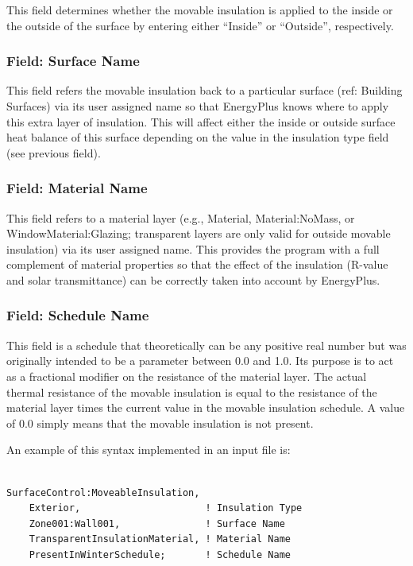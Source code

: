 This field determines whether the movable insulation is applied to the inside or the outside of the surface by entering either ``Inside'' or ``Outside'', respectively.

\subsubsection{Field: Surface Name}\label{field-surface-name-1}

This field refers the movable insulation back to a particular surface (ref: Building Surfaces) via its user assigned name so that EnergyPlus knows where to apply this extra layer of insulation. This will affect either the inside or outside surface heat balance of this surface depending on the value in the insulation type field (see previous field).

\subsubsection{Field: Material Name}\label{field-material-name}

This field refers to a material layer (e.g., Material, Material:NoMass, or WindowMaterial:Glazing; transparent layers are only valid for outside movable insulation) via its user assigned name. This provides the program with a full complement of material properties so that the effect of the insulation (R-value and solar transmittance) can be correctly taken into account by EnergyPlus.

\subsubsection{Field: Schedule Name}\label{field-schedule-name}

This field is a schedule that theoretically can be any positive real number but was originally intended to be a parameter between 0.0 and 1.0. Its purpose is to act as a fractional modifier on the resistance of the material layer. The actual thermal resistance of the movable insulation is equal to the resistance of the material layer times the current value in the movable insulation schedule. A value of 0.0 simply means that the movable insulation is not present.

An example of this syntax implemented in an input file is:

\begin{lstlisting}

SurfaceControl:MoveableInsulation,
    Exterior,                      ! Insulation Type
    Zone001:Wall001,               ! Surface Name
    TransparentInsulationMaterial, ! Material Name
    PresentInWinterSchedule;       ! Schedule Name
\end{lstlisting}

